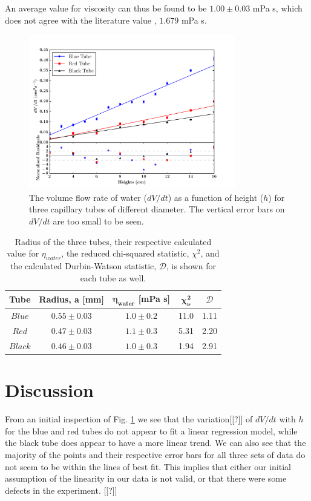 \documentclass[twocolumn]{revtex4}
\begin{document}
An average value for viscosity can thus be found to be $1.00 \pm 0.03$ mPa s, which does not agree with the literature value \cite{crc}, $1.679$  mPa {s}. 

\vspace{-1ex}
\begin{figure}[!h]
\begin{center}
\includegraphics[width=9cm]{fig1-2}
\caption[]{The volume flow rate of water ($dV/dt$) as a function of height ($h$) for three capillary tubes of different diameter. The vertical error bars on $dV/dt$ are too small to be seen.}
\label{fig:fig2}
\end{center}
\end{figure}

\begin{table}[h!]
\centering
\begin{tabular}{ |c|c|c|c|c| } 
 \hline
 \textbf{Tube} & \textbf{Radius, a [mm]} & \textbf{$\boldsymbol{\eta_{water}}$ [mPa {s}]} & \textbf{$\boldsymbol{\chi^2_{\nu}}$} & $\mathcal{D}$\\ [0.5ex] 
 \hline\hline
 $Blue$ &$0.55\pm0.03$ & $1.0\pm0.2$ & 11.0 & 1.11\\ 
 $Red$ & $0.47\pm0.03$ & $1.1\pm0.3$ & 5.31 & 2.20\\
 $Black$ & $0.46\pm0.03$ & $1.0\pm0.3$ & 1.94 & 2.91\\
 
 \hline
\end{tabular}
\caption{Radius of the three tubes, their respective calculated value for $\eta_{water}$, the reduced chi-squared statistic, $\chi^2$, and the calculated Durbin-Watson statistic, $\mathcal{D}$, is shown for each tube as well.}
\label{table:1}
\end{table}


\vspace{-3ex}
\section{Discussion}
\vspace{-2ex}
From an initial inspection of Fig. \ref{fig:fig2} we see that the variation[[?]] of $dV/dt$ with $h$ for the blue and red tubes do not appear to fit a linear regression model, while the black tube does appear to have a more linear trend. We can also see that the majority of the points and their respective error bars for all three sets of data do not seem to be within the lines of best fit. This implies that either our initial assumption of the linearity in our data is not valid, or that there were some defects in the experiment. [[?]]
\end{document}
